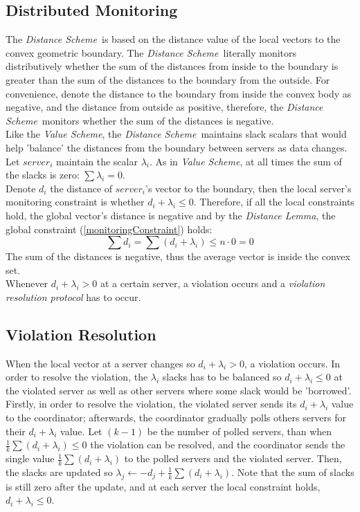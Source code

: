 \documentclass[10pt, conference]{IEEEtran}
\newcommand{\valueScheme}{\textit{Value Scheme}}
\newcommand{\distanceScheme}{\textit{Distance Scheme}}
\begin{document}
\subsection{Distributed Monitoring}
The \distanceScheme \ is based on the distance value of the local vectors to the convex geometric boundary. The \distanceScheme \ literally monitors distributively whether the sum of the distances from inside to the boundary is greater than the sum of the distances to the boundary from the outside. For convenience, denote the distance to the boundary from inside the convex body as negative, and the distance from outside as positive, therefore, the \distanceScheme \ monitors whether the sum of the distances is negative. \\
Like the \valueScheme , the \distanceScheme \ maintains slack scalars that would help 'balance' the distances from the boundary between servers as data changes. Let $server_i$ maintain the scalar $\lambda _i$. As in \valueScheme , at all times the sum of the slacks is zero: ${\sum {\lambda _i} = 0}$. \\
Denote $d_i$ the distance of $server_i$'s vector to the boundary, then the local server's monitoring constraint is whether ${d_i + \lambda_i \leq 0}$. Therefore, if all the local constraints hold, the global vector's distance is negative and by the \textit{Distance Lemma}, the global constraint (\ref{monitoringConstraint}) holds:
\begin{equation}
\sum{d_i} = \sum{(d_i + \lambda _i)} \leq n \cdot 0 = 0
\end{equation}
The sum of the distances is negative, thus the average vector is inside the convex set. \\
Whenever ${d_i + \lambda _i > 0}$ at a certain server, a violation occurs and a  \textit{violation resolution protocol} has to occur. 
\subsection{Violation Resolution}
When the local vector at a server changes so ${d_i + \lambda _i > 0}$, a violation occurs. In order to resolve the violation, the $\lambda _i$ slacks has to be balanced so ${d_i + \lambda _i \leq 0}$ at the violated server as well as other servers where some slack would be 'borrowed'. \\
Firstly, in order to resolve the violation, the violated server sends its ${d_i + \lambda _i}$ value to the coordinator; afterwards, the coordinator gradually polls others servers for their ${d_i + \lambda _i}$ value. Let $(k-1)$ be the number of polled servers, than when ${\frac{1}{k}\sum(d_i + \lambda _i) \leq 0}$ the violation can be resolved, and the coordinator sends the single value ${\frac{1}{k}\sum(d_i + \lambda _i)}$ to the polled servers and the violated server. Then, the slacks are updated so ${\lambda _j 
\leftarrow -d_j + \frac{1}{k}\sum(d_i + \lambda _i)}$. Note that the sum of slacks is still zero after the update, and at each server the local constraint holds, ${d_i + \lambda _i \leq 0}$.
\end{document}
